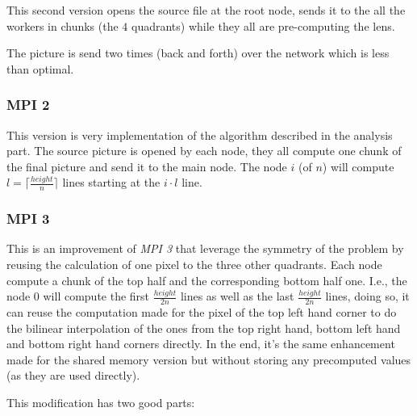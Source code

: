 \documentclass[10pt,a4paper]{article}
\begin{document}
This second version opens the source file at the root node, sends it to the all
the workers in chunks (the $4$ quadrants) while they all are pre-computing the
lens.

The picture is send two times (back and forth) over the network which is less
than optimal.

\subsubsection{MPI 2}

This version is very implementation of the algorithm described in the analysis
part. The source picture is opened by each node, they all compute one chunk of
the final picture and send it to the main node. The node $i$ (of $n$) will
compute $l = \lceil{}\frac{height}{n}\rceil{}$ lines starting at the $i \cdot
l$ line.

\subsubsection{MPI 3}

This is an improvement of \emph{MPI 3} that leverage the symmetry of the
problem by reusing the calculation of one pixel to the three other quadrants.
Each node compute a chunk of the top half and the corresponding bottom half one.
I.e., the node $0$ will compute the first $\frac{height}{2 n}$ lines as well as
the last $\frac{height}{2 n}$ lines, doing so, it can reuse the computation
made for the pixel of the top left hand corner to do the bilinear interpolation
of the ones from the top right hand, bottom left hand and bottom right hand
corners directly. In the end, it's the same enhancement made for the shared
memory version but without storing any precomputed values (as they are used
directly).

This modification has two good parts:
\end{document}
